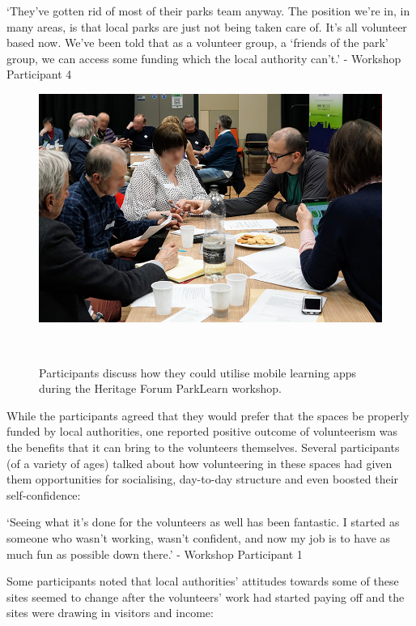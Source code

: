 \begin{displayquote}
`They've gotten rid of most of their parks team anyway. The position we're in, in many areas, is that local parks are just not being taken care of. It's all volunteer based now. We've been told that as a volunteer group, a `friends of the park' group, we can access some funding which the local authority can't.' - Workshop Participant 4
\end{displayquote}

\begin{figure}
  \centering
  \includegraphics[width=0.9\columnwidth]{images/chapter06/HF_Workshop.jpg}
  \caption[The Heritage Forum ParkLearn workshop]{Participants discuss how they could utilise mobile learning apps during the Heritage Forum ParkLearn workshop.}~\label{fig:ParkLearnWorkshop}
\end{figure}

While the participants agreed that they would prefer that the spaces be properly funded by local authorities, one reported positive outcome of volunteerism was the benefits that it can bring to the volunteers themselves. Several participants (of a variety of ages) talked about how volunteering in these spaces had given them opportunities for socialising, day-to-day structure and even boosted their self-confidence:

\begin{displayquote}
`Seeing what it's done for the volunteers as well has been fantastic. I started as someone who wasn't working, wasn't confident, and now my job is to have as much fun as possible down there.' - Workshop Participant 1
\end{displayquote}

Some participants noted that local authorities' attitudes towards some of these sites seemed to change after the volunteers' work had started paying off and the sites were drawing in visitors and income:

